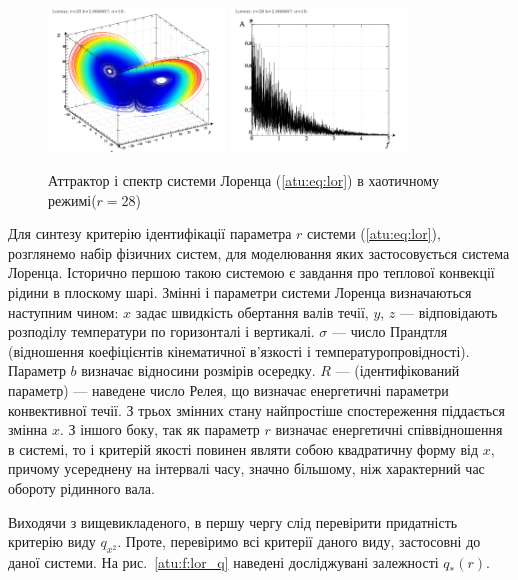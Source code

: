 \documentclass[a4paper,13pt]{atuaref}
\begin{document}
\begin{figure}[ht!]
\begin{center}
  \includegraphics[width=0.42\textwidth]{p5/p/cha/lor/lor0-p_xyz_r=028.png}
  \hfill
  \includegraphics[width=0.42\textwidth]{p5/p/cha/lor/lor0_fft-p_f_r=028.png}
\end{center}
  \caption{Аттрактор і спектр системи Лоренца (\ref{atu:eq:lor}) в хаотичному режимі($r=28$)}
\label{atu:f:lor_attractor_phase_chaos28}
\end{figure}

Для синтезу критерію ідентифікації параметра $ r $ системи
(\ref{atu:eq:lor}), розглянемо набір фізичних систем, для моделювання яких застосовується
система Лоренца. Історично першою такою системою є завдання про теплової
конвекції рідини в плоскому шарі.
Змінні і параметри системи Лоренца визначаються наступним чином: $ x $ задає
швидкість обертання валів течії, $ y $, $ z $ --- відповідають розподілу
температури по горизонталі і вертикалі. $ \sigma $ --- число Прандтля
(відношення коефіцієнтів кінематичної в'язкості і температуропровідності).
Параметр $ b $ визначає відносини розмірів осередку. $ R $ --- (ідентифікований
параметр) --- наведене число Релея, що визначає енергетичні параметри
конвективної течії.
З трьох змінних стану найпростіше спостереження піддається змінна $ x $.
З іншого боку, так як параметр $ r $ визначає енергетичні співвідношення в
системі, то і критерій якості повинен являти собою квадратичну форму від $ x $,
причому усереднену на інтервалі часу, значно більшому, ніж характерний час
обороту рідинного вала.

Виходячи з вищевикладеного, в першу чергу слід перевірити придатність критерію
виду $ q_ {x ^ 2} $. Проте, перевіримо всі критерії даного виду, застосовні до
даної системи. На рис.~\ref{atu:f:lor_q} наведені досліджувані залежності
$q_{*}(r)$.
\end{document}
